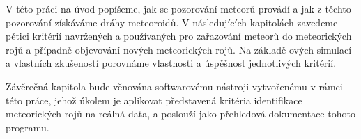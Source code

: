 \medskip

V této práci na úvod popíšeme, jak se pozorování meteorů provádí a jak z těchto pozorování získáváme dráhy meteoroidů. V následujících kapitolách zavedeme pětici kritérií navržených a používaných pro zařazování meteorů do meteorických rojů a případně objevování nových meteorických rojů. Na základě \citeauthor{galligan}ových simulací a vlastních zkušeností porovnáme vlastnosti a úspěšnost jednotlivých kritérií.

Závěrečná kapitola bude věnována softwarovému nástroji vytvořenému v rámci této práce, jehož úkolem je aplikovat představená kritéria identifikace meteorických rojů na reálná data, a poslouží jako přehledová dokumentace tohoto programu.